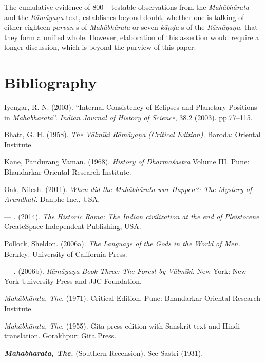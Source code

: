The cumulative evidence of 800+ testable observations from the \textit{Mahābhārata} and the \textit{Rāmāyaṇa} text, establishes beyond doubt, whether one is talking of either eighteen \textit{parvan}-s of \textit{Mahābhārata} or seven \textit{kāṇḍa}-s of the \textit{Rāmāyaṇa}, that they form a unified whole. However, elaboration of this assertion would require a longer discussion, which is beyond the purview of this paper.


\section*{Bibliography}

\begin{thebibliography}{99}
\itemsep=1pt
 Iyengar, R. N. (2003). “Internal Consistency of Eclipses and Planetary Positions in \textit{Mahābhārata}”. \textit{Indian Journal of History of Science}, 38.2 (2003). pp.77--115.

  Bhatt, G. H. (1958). \textit{The Vālmīki Rāmāyaṇa (Critical Edition).} Baroda: Oriental Institute.

  Kane, Pandurang Vaman. (1968). \textit{History of Dharmaśāstra} Volume III. Pune: Bhandarkar Oriental Research Institute.

  Oak, Nilesh. (2011). \textit{When did the Mahābhārata war Happen?: The Mystery of Arundhati}. Danphe Inc., USA.

  — . (2014). \textit{The Historic Rama: The Indian civilization at the end of Pleistocene}. CreateSpace Independent Publishing, USA.

  Pollock, Sheldon. (2006a). \textit{The Language of the Gods in the World of Men.} Berkley: University of California Press.

  — . (2006b). \textit{Rāmāyaṇa} \textit{Book Three: The Forest by Vālmīki.} New York: New York University Press and JJC Foundation.

  \textit{Mahābhārata, The.} (1971). Critical Edition. Pune: Bhandarkar Oriental Research Institute.

  \textit{Mahābhārata, The.} (1955). Gita press edition with Sanskrit text and Hindi translation. Gorakhpur: Gita Press.

  \textbf{\textit{Mahābhārata, The.}} (Southern Recension). See Sastri (1931).


\end{thebibliography}
